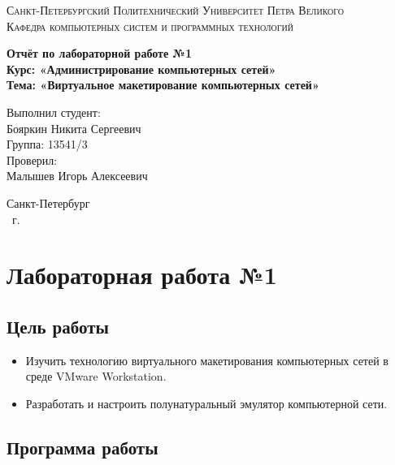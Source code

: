 \documentclass[14pt,a4paper,report]{report}
\begin{document}
\def\contentsname{Содержание}

\begin{titlepage}
	\begin{center}
		\textsc{Санкт-Петербургский Политехнический 
			Университет Петра Великого\\[5mm]
			Кафедра компьютерных систем и программных технологий}
		
		\vfill
		
		\textbf{Отчёт по лабораторной работе №1\\[3mm]
			Курс: «Администрирование компьютерных сетей»\\[3mm]
			Тема: «Виртуальное макетирование компьютерных сетей»\\[35mm]
			}
	\end{center}
	
	\hfill
	\begin{minipage}{.5\textwidth}
		Выполнил студент:\\[2mm] 
		Бояркин Никита Сергеевич\\
		Группа: 13541/3\\[5mm]
		
		Проверил:\\[2mm] 
		Малышев Игорь Алексеевич
	\end{minipage}
	\vfill
	\begin{center}
		Санкт-Петербург\\ \the\year\ г.
	\end{center}
\end{titlepage}

\tableofcontents
\clearpage

\chapter{Лабораторная работа №1}

\section{Цель работы}

\begin{itemize}
	\item Изучить технологию виртуального макетирования компьютерных сетей в среде VMware Workstation.
	\item Разработать и настроить полунатуральный эмулятор компьютерной сети.
\end{itemize}

\section{Программа работы}
\end{document}
